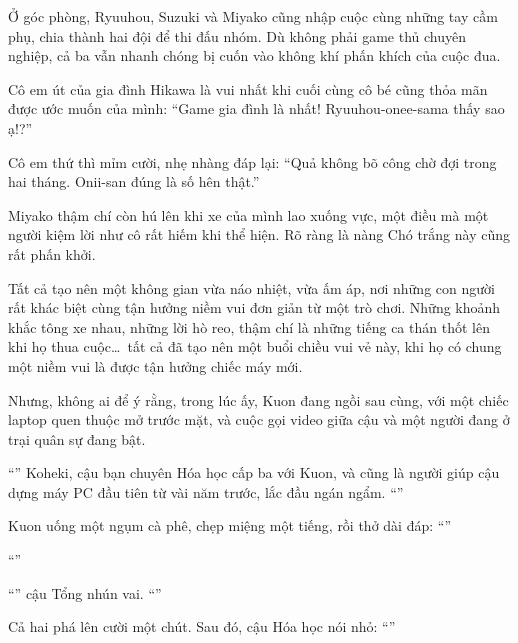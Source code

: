 \documentclass[../main.tex]{subfiles}
\begin{document}
Ở góc phòng, Ryuuhou, Suzuki và Miyako cũng nhập cuộc cùng những tay cầm phụ, chia thành hai đội để thi đấu nhóm. Dù không phải game thủ chuyên nghiệp, cả ba vẫn nhanh chóng bị cuốn vào không khí phấn khích của cuộc đua.

Cô em út của gia đình Hikawa là vui nhất khi cuối cùng cô bé cũng thỏa mãn được ước muốn của mình: ``Game gia đình là nhất! Ryuuhou-onee-sama thấy sao ạ!?''

Cô em thứ thì mỉm cười, nhẹ nhàng đáp lại: ``Quả không bõ công chờ đợi trong hai tháng. Onii-san đúng là số hên thật.''

Miyako thậm chí còn hú lên khi xe của mình lao xuống vực, một điều mà một người kiệm lời như cô rất hiếm khi thể hiện. Rõ ràng là nàng Chó trắng này cũng rất phấn khởi.

Tất cả tạo nên một không gian vừa náo nhiệt, vừa ấm áp,  nơi những con người rất khác biệt cùng tận hưởng niềm vui đơn giản từ một trò chơi. Những khoảnh khắc tông xe nhau, những lời hò reo, thậm chí là những tiếng ca thán thốt lên khi họ thua cuộc\dots\ tất cả đã tạo nên một buổi chiều vui vẻ này, khi họ có chung một niềm vui là được tận hưởng chiếc máy mới.

Nhưng, không ai để ý rằng, trong lúc ấy, Kuon đang ngồi sau cùng, với một chiếc laptop quen thuộc mở trước mặt, và cuộc gọi video giữa cậu và một người đang ở trại quân sự đang bật.

\il

``'' Koheki, cậu bạn chuyên Hóa học cấp ba với Kuon, và cũng là người giúp cậu dựng máy PC đầu tiên từ vài năm trước, lắc đầu ngán ngẩm. ``''

Kuon uống một ngụm cà phê, chẹp miệng một tiếng, rồi thở dài đáp: ``''

``''

``'' cậu Tổng nhún vai. ``''

Cả hai phá lên cười một chút. Sau đó, cậu Hóa học nói nhỏ: ``''
\end{document}
